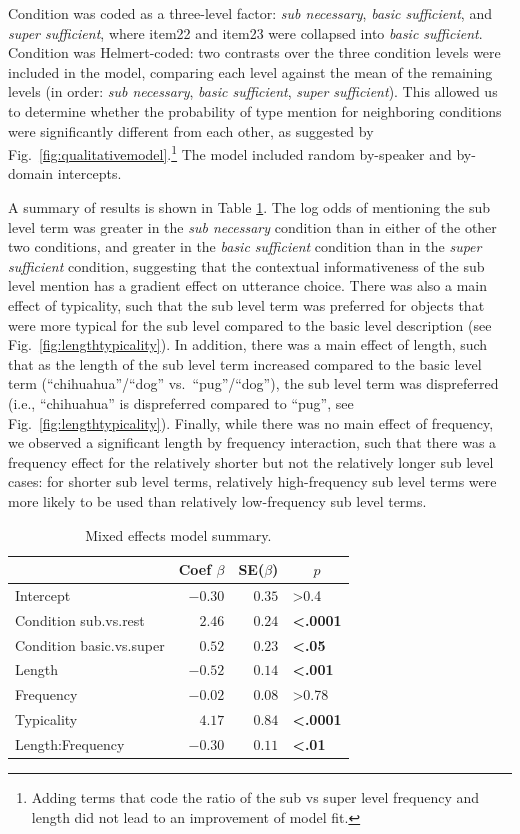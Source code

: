 \documentclass[10pt,letterpaper]{article}
\newcommand{\tableref}[1]{Table \ref{#1}}
\newcommand{\figref}[1]{Fig.~\ref{#1}}
\begin{document}
Condition was coded as a three-level factor: \emph{sub necessary}, \emph{basic sufficient}, and \emph{super sufficient}, where item22 and item23 were collapsed into \emph{basic sufficient}. Condition was Helmert-coded: two contrasts over the three condition levels were included in the model, comparing each level against the mean of the remaining levels (in order: \emph{sub necessary}, \emph{basic sufficient}, \emph{super sufficient}). This allowed us to determine whether the probability of type mention  for neighboring conditions were significantly different from each other, as suggested by \figref{fig:qualitativemodel}.\footnote{Adding terms that code the ratio of the sub vs super level frequency and length did not lead to an improvement of model fit.} The model included random by-speaker and by-domain intercepts. 



A summary of results is shown in \tableref{tab:modelresults}. The log odds of mentioning the sub level term was greater in the \emph{sub necessary} condition than in either of the other two conditions, and greater in the \emph{basic sufficient} condition than in the \emph{super sufficient} condition, suggesting that the contextual informativeness of the sub level mention has a gradient effect on utterance choice. There was also a main effect of typicality, such that the sub level term was preferred for objects that were more typical for the sub level compared to the basic level  description (see \figref{fig:lengthtypicality}). In addition, there was a main effect of length, such that as the length of the sub level term increased compared to the basic level term (``chihuahua''/``dog'' vs.~``pug''/``dog''), the sub level term was dispreferred (i.e., ``chihuahua'' is dispreferred compared to ``pug'', see \figref{fig:lengthtypicality}). Finally, while there was no main effect of frequency, we observed a significant length by frequency interaction, such that there was a frequency effect for the relatively shorter but not the relatively longer sub level cases: for shorter sub level terms, relatively high-frequency sub level terms were more likely to be used than relatively low-frequency sub level terms. 



\begin{table}[!tbp]
\caption{Mixed effects model summary.}
\begin{center}
\begin{tabular}{lrrl}
\toprule
\multicolumn{1}{l}{}&\multicolumn{1}{c}{Coef $\beta$}&\multicolumn{1}{c}{SE($\beta$)}&\multicolumn{1}{c}{$p$}\tabularnewline
\midrule
Intercept&$-0.30$&$0.35$&\textgreater0.4\tabularnewline
Condition sub.vs.rest&$ 2.46$&$0.24$&\textbf{\textless.0001}\tabularnewline
Condition basic.vs.super&$ 0.52$&$0.23$&\textbf{\textless.05}\tabularnewline
Length&$-0.52$&$0.14$&\textbf{\textless.001}\tabularnewline
Frequency&$-0.02$&$0.08$&\textgreater0.78\tabularnewline
Typicality&$ 4.17$&$0.84$&\textbf{\textless.0001}\tabularnewline
Length:Frequency&$-0.30$&$0.11$&\textbf{\textless.01}\tabularnewline
\bottomrule
\end{tabular}\end{center}
\label{tab:modelresults}
\end{table}
\end{document}
